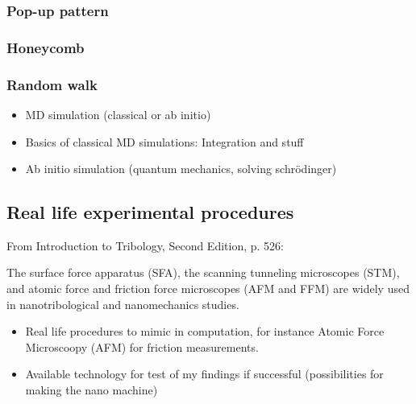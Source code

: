 \subsubsection{Pop-up pattern}
\subsubsection{Honeycomb}
\subsubsection{Random walk}






\begin{itemize}
  \item MD simulation (classical or ab initio)
  \item Basics of classical MD simulations: Integration and stuff
  \item Ab initio simulation (quantum mechanics, solving schrödinger)
\end{itemize}
\subsection{Real life experimental procedures}
From Introduction to Tribology, Second Edition, p. 526: \par The surface force apparatus (SFA), the scanning tunneling microscopes (STM),
and atomic force and friction force microscopes (AFM and FFM) are widely used in nanotribological and nanomechanics studies.



\begin{itemize}
  \item Real life procedures to mimic in computation, for instance Atomic Force Microscoopy (AFM) for friction measurements.
  \item Available technology for test of my findings if successful (possibilities for making the nano machine) 
\end{itemize}
